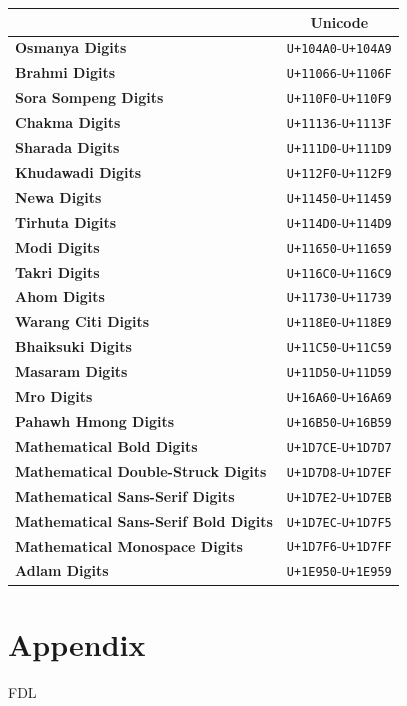 \documentclass [10pt]{article}
\begin{document}
\begin{center}
  \begin{tabular}{|l|c|}
    \hline
    & \textbf{Unicode} \\ \hline
    \textbf{Osmanya Digits} & \texttt{U+104A0}-\texttt{U+104A9} \\ \hline
    \textbf{Brahmi Digits} & \texttt{U+11066}-\texttt{U+1106F} \\ \hline
    \textbf{Sora Sompeng Digits} & \texttt{U+110F0}-\texttt{U+110F9} \\ \hline
    \textbf{Chakma Digits} & \texttt{U+11136}-\texttt{U+1113F} \\ \hline
    \textbf{Sharada Digits} & \texttt{U+111D0}-\texttt{U+111D9} \\ \hline
    \textbf{Khudawadi Digits} & \texttt{U+112F0}-\texttt{U+112F9} \\ \hline
    \textbf{Newa Digits} & \texttt{U+11450}-\texttt{U+11459} \\ \hline
    \textbf{Tirhuta Digits} & \texttt{U+114D0}-\texttt{U+114D9} \\ \hline
    \textbf{Modi Digits} & \texttt{U+11650}-\texttt{U+11659} \\ \hline
    \textbf{Takri Digits} & \texttt{U+116C0}-\texttt{U+116C9} \\ \hline
    \textbf{Ahom Digits} & \texttt{U+11730}-\texttt{U+11739} \\ \hline
    \textbf{Warang Citi Digits} & \texttt{U+118E0}-\texttt{U+118E9} \\ \hline
    \textbf{Bhaiksuki Digits} & \texttt{U+11C50}-\texttt{U+11C59} \\ \hline
    \textbf{Masaram Digits} & \texttt{U+11D50}-\texttt{U+11D59} \\ \hline
    \textbf{Mro Digits} & \texttt{U+16A60}-\texttt{U+16A69} \\ \hline
    \textbf{Pahawh Hmong Digits} & \texttt{U+16B50}-\texttt{U+16B59} \\ \hline
    \textbf{Mathematical Bold Digits}
    & \texttt{U+1D7CE}-\texttt{U+1D7D7} \\ \hline
    \textbf{Mathematical Double-Struck Digits}
    & \texttt{U+1D7D8}-\texttt{U+1D7EF} \\ \hline
    \textbf{Mathematical Sans-Serif Digits}
    & \texttt{U+1D7E2}-\texttt{U+1D7EB} \\ \hline
    \textbf{Mathematical Sans-Serif Bold Digits}
    & \texttt{U+1D7EC}-\texttt{U+1D7F5} \\ \hline
    \textbf{Mathematical Monospace Digits}
    & \texttt{U+1D7F6}-\texttt{U+1D7FF} \\ \hline
    \textbf{Adlam Digits}
    & \texttt{U+1E950}-\texttt{U+1E959} \\ \hline
  \end{tabular}
\end{center}

\newpage
\section {Appendix}
 {FDL}
\end{document}
